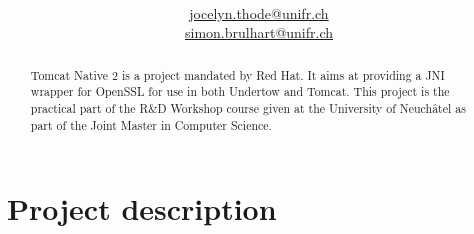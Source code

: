 \documentclass[11pt,a4paper,bibliography=totocnumbered]{scrartcl}
\author{\myauthor\\ \href{mailto:jocelyn.thode@unifr.ch}{jocelyn.thode@unifr.ch} \\ \href{mailto:simon.brulhart@unifr.ch}{simon.brulhart@unifr.ch}}
\title{\huge \textbf{\mytitle}}
\def\mytitle{Tomcat Native 2}
\begin{document}
\graphicspath{{figures/}}

\begin{titlingpage}

\maketitle

\begin{abstract}
\mytitle{} is a project mandated by Red Hat. It aims at providing a JNI wrapper for OpenSSL for use in both Undertow and Tomcat. This project is the practical part of the R\&D Workshop course given at the University of Neuchâtel as part of the Joint Master in Computer Science.
\end{abstract}

\begin{figure}[b]
\centering
{}
\qquad
{}
\qquad
{}
\end{figure}

\end{titlingpage}

\pagebreak

\setcounter{tocdepth}{2}
\tableofcontents
\listoffigures

\pagebreak

\section{Project description}
\end{document}
